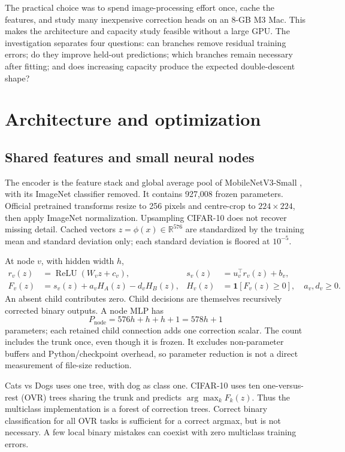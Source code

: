 \documentclass[11pt,a4paper]{article}
\newcommand{\ind}{\mathbf{1}}
\begin{document}
The practical choice was to spend image-processing effort once, cache the features, and study many inexpensive correction heads on an 8-GB M3 Mac. This makes the architecture and capacity study feasible without a large GPU. The investigation separates four questions: can branches remove residual training errors; do they improve held-out predictions; which branches remain necessary after fitting; and does increasing capacity produce the expected double-descent shape?

\section{Architecture and optimization}
\subsection{Shared features and small neural nodes}
The encoder is the feature stack and global average pool of MobileNetV3-Small \cite{mobilepaper,mobile}, with its ImageNet classifier removed. It contains 927,008 frozen parameters. Official pretrained transforms resize to 256 pixels and centre-crop to $224\times224$, then apply ImageNet normalization. Upsampling CIFAR-10 does not recover missing detail. Cached vectors $z=\phi(x)\in\mathbb{R}^{576}$ are standardized by the training mean and standard deviation only; each standard deviation is floored at $10^{-5}$.

At node $v$, with hidden width $h$,
\begin{align}
 r_v(z)&=\operatorname{ReLU}(W_vz+c_v), & s_v(z)&=u_v^\top r_v(z)+b_v,\\
 F_v(z)&=s_v(z)+a_v H_A(z)-d_v H_B(z), & H_v(z)&=\ind[F_v(z)\geq0],\quad a_v,d_v\geq0.
\end{align}
An absent child contributes zero. Child decisions are themselves recursively corrected binary outputs. A node MLP has
\begin{equation}
P_{\mathrm{node}}=576h+h+h+1=578h+1
\end{equation}
parameters; each retained child connection adds one correction scalar. The count includes the trunk once, even though it is frozen. It excludes non-parameter buffers and Python/checkpoint overhead, so parameter reduction is not a direct measurement of file-size reduction.

Cats vs Dogs uses one tree, with dog as class one. CIFAR-10 uses ten one-versus-rest (OVR) trees sharing the trunk and predicts $\arg\max_k F_k(z)$. Thus the multiclass implementation is a forest of correction trees. Correct binary classification for all OVR tasks is sufficient for a correct argmax, but is not necessary. A few local binary mistakes can coexist with zero multiclass training errors.
\end{document}
